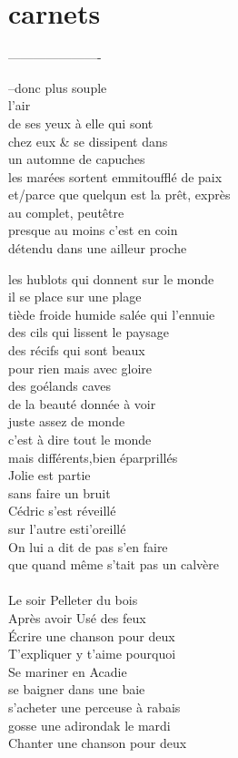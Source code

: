 %
\section*{carnets}
----------------------
\begin{center}
--donc plus souple\\
l'air\\
de ses yeux à elle qui sont\\
chez eux \& se dissipent dans\\
un automne de capuches\\
les marées sortent emmitoufflé de paix\\
et/parce que quelqun est la prêt, exprès\\
au complet, peutêtre \\
presque au moins c'est en coin\\
détendu dans une ailleur proche\\
\end{center}

les hublots qui donnent sur le monde\\
il se place sur une plage\\
tiède froide humide salée qui l'ennuie\\
des cils qui lissent le paysage\\
des récifs qui sont beaux\\
pour rien mais avec gloire\\
des goélands caves\\
de la beauté donnée à voir\\
juste assez de monde\\
c'est à dire tout le monde\\
mais différents,bien éparprillés\\
\clearpage
Jolie est partie \\
sans faire un bruit\\
Cédric s'est réveillé\\
sur l'autre esti'oreillé\\
On lui a dit de pas s'en faire\\
que quand même s'tait pas un calvère\\
\\
Le soir Pelleter du bois\\
Après avoir Usé des feux\\
Écrire une chanson pour deux\\
T'expliquer y t'aime pourquoi\\
Se mariner en Acadie \\
se baigner dans une baie\\
s'acheter une perceuse à rabais\\
gosse une adirondak le mardi\\
Chanter une chanson pour deux\\
\clearpage
